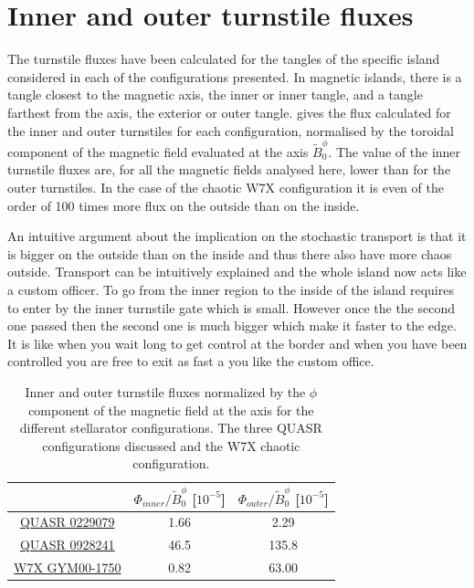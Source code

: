 \section{Inner and outer turnstile fluxes}

The turnstile fluxes have been calculated for the tangles of the specific island considered in each of the configurations presented. In magnetic islands, there is a tangle closest to the magnetic axis, the inner or inner tangle, and a tangle farthest from the axis, the exterior or outer tangle.  gives the flux calculated for the inner and outer turnstiles for each configuration, normalised by the toroidal component of the magnetic field evaluated at the axis $\tilde{B}_0^\phi$. The value of the inner turnstile fluxes are, for all the magnetic fields analysed here, lower than for the outer turnstiles. In the case of the chaotic W7X configuration it is even of the order of 100 times more flux on the outside than on the inside.

An intuitive argument about the implication on the stochastic transport is that it is bigger on the outside than on the inside and thus there also have more chaos outside. Transport can be intuitively explained and the whole island now acts like a custom officer. To go from the inner region to the inside of the island requires to enter by the inner turnstile gate which is small. However once the the second one passed then the second one is much bigger which make it faster to the edge. It is like when you wait long to get control at the border and when you have been controlled you are free to exit as fast a you like the custom office.

\begin{table}[H]
    \centering
    \begin{tabular}{c|c|c}
        & $\Phi_{inner}/\tilde{B}_0^\phi$ [$10^{-5}$] & $\Phi_{outer}/\tilde{B}_0^\phi$ [$10^{-5}$]\\ 
        \hline \hyperref[sec:quars-0229079]{QUASR 0229079} & 1.66 & 2.29\\
        \hline \hyperref[sec:quars-0928241]{QUASR 0928241} & 46.5 & 135.8\\
        \hline \hyperref[sec:w7x]{W7X GYM00-1750} & 0.82 & 63.00\\
    \end{tabular}
    \caption{Inner and outer turnstile fluxes normalized by the $\phi$ component of the magnetic field at the axis for the different stellarator configurations. The three QUASR configurations discussed and the W7X chaotic configuration.}
    \label{tab:inner-outer-fluxes}
\end{table}